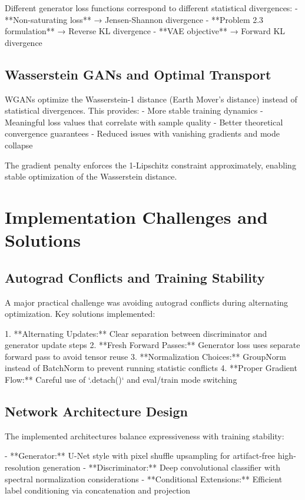 \documentclass{article}
\begin{document}
Different generator loss functions correspond to different statistical divergences:
- **Non-saturating loss** → Jensen-Shannon divergence
- **Problem 2.3 formulation** → Reverse KL divergence
- **VAE objective** → Forward KL divergence

\subsection{Wasserstein GANs and Optimal Transport}

WGANs optimize the Wasserstein-1 distance (Earth Mover's distance) instead of statistical divergences. This provides:
- More stable training dynamics
- Meaningful loss values that correlate with sample quality
- Better theoretical convergence guarantees
- Reduced issues with vanishing gradients and mode collapse

The gradient penalty enforces the 1-Lipschitz constraint approximately, enabling stable optimization of the Wasserstein distance.

\section{Implementation Challenges and Solutions}

\subsection{Autograd Conflicts and Training Stability}

A major practical challenge was avoiding autograd conflicts during alternating optimization. Key solutions implemented:

1. **Alternating Updates:** Clear separation between discriminator and generator update steps
2. **Fresh Forward Passes:** Generator loss uses separate forward pass to avoid tensor reuse
3. **Normalization Choices:** GroupNorm instead of BatchNorm to prevent running statistic conflicts
4. **Proper Gradient Flow:** Careful use of `.detach()` and eval/train mode switching

\subsection{Network Architecture Design}

The implemented architectures balance expressiveness with training stability:

- **Generator:** U-Net style with pixel shuffle upsampling for artifact-free high-resolution generation
- **Discriminator:** Deep convolutional classifier with spectral normalization considerations
- **Conditional Extensions:** Efficient label conditioning via concatenation and projection
\end{document}
